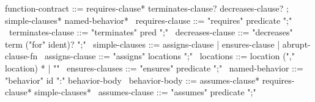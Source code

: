 \begin{syntax}
  function-contract ::= requires-clause* terminates-clause? decreases-clause? ;
               simple-clauses* named-behavior* 
  \
  requires-clause ::= "requires" predicate ";"
  \
  terminates-clause ::= "terminates" pred ";"
  \
  decreases-clause ::= "decreases" term ("for" ident)? ";"
  \
  simple-clauses ::= assigns-clause | ensures-clause | {abrupt-clause-fn}
  \
  assigns-clause ::= "assigns" locations ";"
  \
  locations ::= location ("," location) * | "\nothing"
  \
  ensures-clauses ::= "ensures" predicate ";"
  \
  named-behavior ::= "behavior" id ":" behavior-body
  \
  behavior-body ::= assumes-clause*
                     {requires-clause}* 
                    simple-clauses* \
  assumes-clause ::= "assumes" predicate ";"
\end{syntax}
